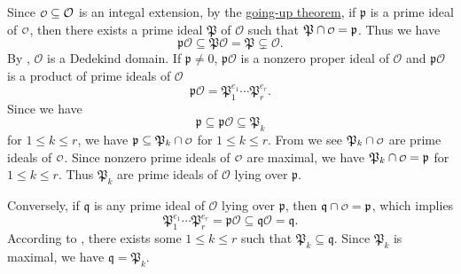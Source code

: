 \begin{prf}
    Since $\mathcalo \subseteq \mathcal{O}$ is an integal extension, by the \hyperref[th:going_up_and_going_down_theorems]{going-up theorem}, if $\mathfrak{p}$ is a prime ideal of $\mathcalo$, then there exists a prime ideal $\mathfrak{P}$ of $\mathcal{O}$ such that $\mathfrak{P}\cap \mathcalo=\mathfrak{p}$. Thus we have 
    \[
    \mathfrak{p}\mathcal{O}\subseteq \mathfrak{P} \mathcal{O}= \mathfrak{P} \subsetneq \mathcal{O}.
    \]
    By , $\mathcal{O}$ is a Dedekind domain. If $\mathfrak{p}\ne 0$, $\mathfrak{p}\mathcal{O}$ is a nonzero proper ideal of $\mathcal{O}$ and $\mathfrak{p}\mathcal{O}$ is a product of prime ideals of $\mathcal{O}$
    \[
    \mathfrak{p}\mathcal{O}=\mathfrak{P}_1^{e_1}\cdots\mathfrak{P}_r^{e_r}.
    \] 
    Since we have
    \[
        \mathfrak{p}\subseteq \mathfrak{p}\mathcal{O} \subseteq \mathfrak{P}_k
    \]
    for $1\le k\le r$, we have $\mathfrak{p}\subseteq \mathfrak{P}_k\cap \mathcalo$ for $1\le k\le r$. From  we see $\mathfrak{P}_k\cap \mathcalo$ are prime ideals of $\mathcalo$. Since nonzero prime ideals of $\mathcalo$ are maximal, we have $\mathfrak{P}_k\cap \mathcalo=\mathfrak{p}$ for $1\le k\le r$. Thus $\mathfrak{P}_k$ are prime ideals of $\mathcal{O}$ lying over $\mathfrak{p}$.

    Conversely, if $\mathfrak{q}$ is any prime ideal of $\mathcal{O}$ lying over $\mathfrak{p}$, then $\mathfrak{q}\cap \mathcalo=\mathfrak{p}$, which implies 
    \[
        \mathfrak{P}_1^{e_1}\cdots\mathfrak{P}_r^{e_r}=\mathfrak{p}\mathcal{O}\subseteq \mathfrak{q} \mathcal{O}=\mathfrak{q}.
    \]
    According to , there exists some $1\le k\le r$ such that $\mathfrak{P}_k\subseteq \mathfrak{q}$. Since $\mathfrak{P}_k$ is maximal, we have $\mathfrak{q}=\mathfrak{P}_k$. 
\end{prf}


